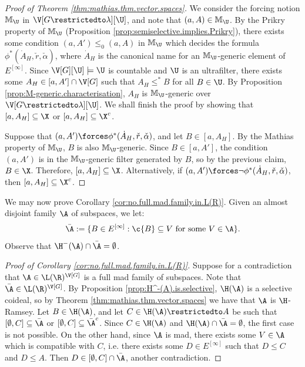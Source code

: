 \documentclass[11pt,reqno]{amsart}
\begin{document}
\begin{proof}[Proof of Theorem \ref{thm:mathias.thm.vector.spaces}]
    We consider the forcing notion $\mathbb{M}_\U$ in $\V[G\restrictedto\lambda][\U]$, and note that $(a,A) \in \mathbb{M}_\U$. By the Prikry property of $\mathbb{M}_\U$ (Proposition \ref{prop:semiselective.implies.Prikry}), there exists some condition $(a,A') \leq_0 (a,A)$ in $\mathbb{M}_\U$ which decides the formula $\phi^*(\dot{A}_H,\check{r},\check{\alpha})$, where $\dot{A}_H$ is the canonical name for an $\mathbb{M}_\U$-generic element of $E^{[\infty]}$. Since $\V[G][\U] \models \U$ is countable and $\U$ is an ultrafilter, there exists some $A_H \in [a,A'] \cap \V[G]$ such that $A_H \leq^* B$ for all $B \in \U$. By Proposition \ref{prop:M-generic.characterisation}, $A_H$ is $\mathbb{M}_\U$-generic over $\V[G\restrictedto\lambda][\U]$. We shall finish the proof by showing that $[a,A_H] \subseteq \X$ or $[a,A_H] \subseteq \X^c$.

    Suppose that $(a,A') \forces \phi^*(\dot{A}_H,\check{r},\check{\alpha})$, and let $B \in [a,A_H]$. By the Mathias property of $\mathbb{M}_\U$, $B$ is also $\mathbb{M}_\U$-generic. Since $B \in [a,A']$, the condition $(a,A')$ is in the $\mathbb{M}_\U$-generic filter generated by $B$, so by the previous claim, $B \in \X$. Therefore, $[a,A_H] \subseteq \X$. Alternatively, if $(a,A') \forces \neg\phi^*(\dot{A}_H,\check{r},\check{\alpha})$, then $[a,A_H] \subseteq \X^c$.
\end{proof}

We may now prove Corollary \ref{cor:no.full.mad.family.in.L(R)}. Given an almost disjoint family $\A$ of subspaces, we let:
\begin{align*}
    \bar{\A} := \{B \in E^{[\infty]} : \c{B} \subseteq V \text{ for some } V \in \A\}.
\end{align*}
Observe that $\H^-(\A) \cap \bar{\A} = \emptyset$.

\begin{proof}[Proof of Corollary \ref{cor:no.full.mad.family.in.L(R)}]
    Suppose for a contradiction that $\A \in \L(\R)^{\V[G]}$ is a full mad family of subspaces. Note that $\bar{\A} \in \L(\R)^{\V[G]}$. By Proposition \ref{prop:H^-(A).is.selective}, $\H(\A)$ is a selective coideal, so by Theorem \ref{thm:mathias.thm.vector.spaces} we have that $\A$ is $\H$-Ramsey. Let $B \in \H(\A)$, and let $C \in \H(\A)\restrictedto A$ be such that $[\emptyset,C] \subseteq \bar{\A}$ or $[\emptyset,C] \subseteq \bar{\A}^c$. Since $C \in \H(\A)$ and $\H(\A) \cap \bar{\A} = \emptyset$, the first case is not possible. On the other hand, since $\A$ is mad, there exists some $V \in \A$ which is compatible with $C$, i.e. there exists some $D \in E^{[\infty]}$ such that $D \leq C$ and $D \leq A$. Then $D \in [\emptyset,C] \cap \bar{\A}$, another contradiction.
\end{proof}
\end{document}
